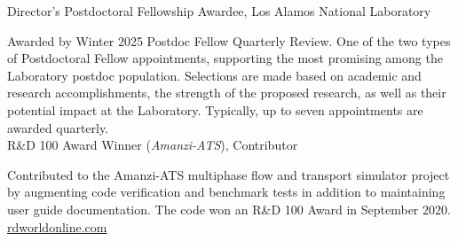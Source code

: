 \documentclass[11pt, letterpaper]{article}
\newcommand{\years}[1]{\marginnote{\scriptsize #1}}
\begin{document}
% 

\years{2025}Director's Postdoctoral Fellowship Awardee, Los Alamos National Laboratory

Awarded by Winter 2025 Postdoc Fellow Quarterly Review. One of the two types of
Postdoctoral Fellow appointments, supporting the most promising among the
Laboratory postdoc population.
Selections are made based on academic and research accomplishments, the
strength of the proposed research, as well as their potential impact at the
Laboratory.  Typically, up to seven appointments are awarded quarterly.\\

\years{2020}R\&D 100 Award Winner (\emph{Amanzi-ATS}), Contributor

    Contributed to the Amanzi-ATS multiphase flow and transport simulator
    project by augmenting code verification and benchmark tests in addition to
    maintaining user guide documentation. The code won an R\&D 100 Award in
    September 2020.
    \href{https://www.rdworldonline.com/rd-100-award-winners-announced-in-mechanical-materials-category/}{rdworldonline.com}\\

\end{document}
